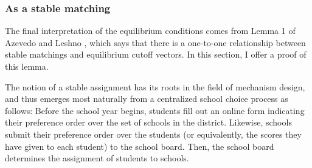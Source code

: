 \documentclass[12pt]{article}
\theoremstyle{definition}
\begin{document}
%
%
%

\subsubsection{As a stable matching}
The final interpretation of the equilibrium conditions comes from Lemma 1 of Azevedo and Leshno \parencite*{supplydemandfw}, which says that there is a one-to-one relationship between stable matchings and equilibrium cutoff vectors. In this section, I offer a proof of this lemma. 

The notion of a stable assignment has its roots in the field of mechanism design, and thus emerges most naturally from a centralized school choice process as follows: Before the school year begins, students fill out an online form indicating their preference order over the set of schools in the district. Likewise, schools submit their preference order over the students (or equivalently, the scores they have given to each student) to the school board. Then, the school board determines the assignment of students to schools. 
\end{document}
